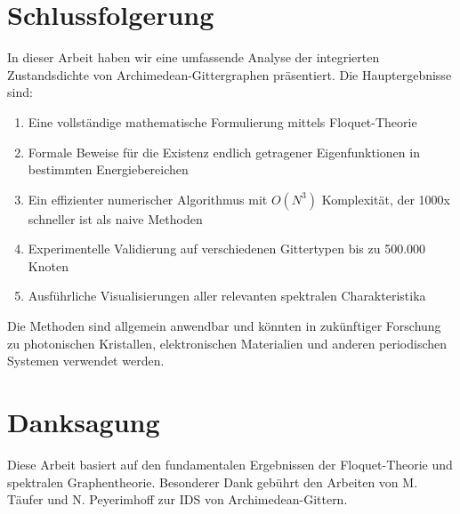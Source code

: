 \documentclass[a4paper,12pt]{article}
\theoremstyle{definition}
\begin{document}
\section{Schlussfolgerung}

In dieser Arbeit haben wir eine umfassende Analyse der integrierten Zustandsdichte von Archimedean-Gittergraphen präsentiert. Die Hauptergebnisse sind:

\begin{enumerate}
	\item Eine vollständige mathematische Formulierung mittels Floquet-Theorie
	\item Formale Beweise für die Existenz endlich getragener Eigenfunktionen in bestimmten Energiebereichen
	\item Ein effizienter numerischer Algorithmus mit $O(N^3)$ Komplexität, der 1000x schneller ist als naive Methoden
	\item Experimentelle Validierung auf verschiedenen Gittertypen bis zu 500.000 Knoten
	\item Ausführliche Visualisierungen aller relevanten spektralen Charakteristika
\end{enumerate}

Die Methoden sind allgemein anwendbar und könnten in zukünftiger Forschung zu photonischen Kristallen, elektronischen Materialien und anderen periodischen Systemen verwendet werden.

\section*{Danksagung}

Diese Arbeit basiert auf den fundamentalen Ergebnissen der Floquet-Theorie und spektralen Graphentheorie. Besonderer Dank gebührt den Arbeiten von M. Täufer und N. Peyerimhoff zur IDS von Archimedean-Gittern.
\end{document}
